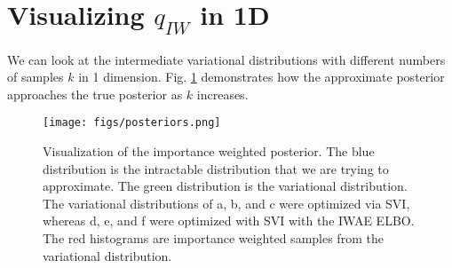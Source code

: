 \documentclass{article} %
\begin{document}
\section{Visualizing \texorpdfstring{$q_{IW}$}{} in 1D}

We can look at the intermediate variational distributions with different numbers of samples $k$ in 1 dimension. Fig. \ref{viz} demonstrates how the approximate posterior approaches the true posterior as $k$ increases. 

\begin{figure}[H]
  \centering
      \texttt{[image: figs/posteriors.png]}
  \caption{Visualization of the importance weighted posterior. The blue distribution is the intractable distribution that we are trying to approximate. The green distribution is the variational distribution. The variational distributions of a, b, and c were optimized via SVI, whereas d, e, and f were optimized with SVI with the IWAE ELBO. The red histograms are importance weighted samples from the variational distribution.}
  \label{viz}
\end{figure}




        
        
        

\end{document}
